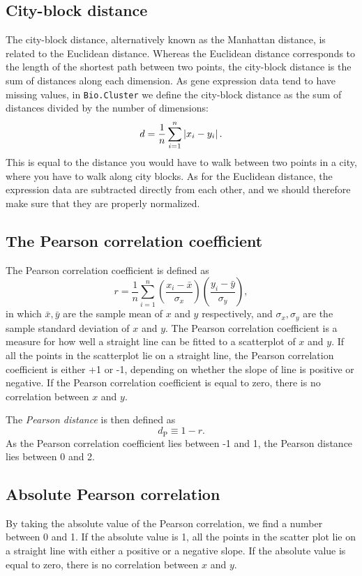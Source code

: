\documentclass{report}
\begin{document}
\subsection*{City-block distance}

The city-block distance, alternatively known as the Manhattan distance, is related to the Euclidean distance. Whereas the Euclidean distance corresponds to the length of the shortest path between two points, the city-block distance is the sum of distances along each dimension. As gene expression data tend to have missing values, in \verb|Bio.Cluster| we define the city-block distance as the sum of distances divided by the number of dimensions:
$$d = {1 \over n} \sum_{i=1}^n \left|x_i-y_i\right|.$$
This is equal to the distance you would have to walk between two points in a city, where you have to walk along city blocks. As for the Euclidean distance,
the expression data are subtracted directly from each other, and we should therefore make sure that they are properly normalized.

\subsection*{The Pearson correlation coefficient}

The Pearson correlation coefficient is defined as
$$r = \frac{1}{n} \sum_{i=1}^n \left( \frac{x_i -\bar{x}}{\sigma_x} \right) \left(\frac{y_i -\bar{y}}{\sigma_y} \right),$$
in which
$\bar{x}, \bar{y}$
are the sample mean of $x$ and $y$ respectively, and
$\sigma_x, \sigma_y$
are the sample standard deviation of $x$ and $y$.
The Pearson correlation coefficient is a measure for how well a straight line can be fitted to a scatterplot of $x$ and $y$.
If all the points in the scatterplot lie on a straight line, the Pearson correlation coefficient is either +1 or -1, depending on whether the slope of line is positive or negative. If the Pearson correlation coefficient is equal to zero, there is no correlation between $x$ and $y$.

The \emph{Pearson distance} is then defined as 
$$d_{\textrm{P}} \equiv 1 - r.$$
As the Pearson correlation coefficient lies between -1 and 1, the Pearson distance lies between 0 and 2.

\subsection*{Absolute Pearson correlation}

By taking the absolute value of the Pearson correlation, we find a number between 0 and 1. If the absolute value is 1, all the points in the scatter plot lie on a straight line with either a positive or a negative slope. If the absolute value is equal to zero, there is no correlation between $x$ and $y$.
\end{document}
